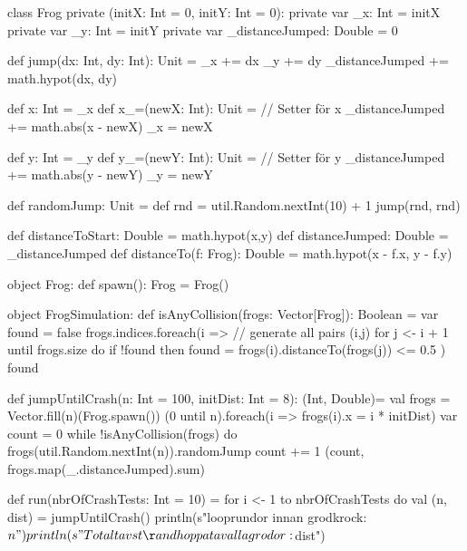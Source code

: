 \SubtaskSolved
\begin{Code}
class Frog private (initX: Int = 0, initY: Int = 0):
    private var _x: Int = initX
    private var _y: Int = initY
    private var _distanceJumped: Double = 0

    def jump(dx: Int, dy: Int): Unit =
        _x += dx
        _y += dy
        _distanceJumped += math.hypot(dx, dy)

    def x: Int = _x
    def x_=(newX: Int): Unit = // Setter för x
        _distanceJumped += math.abs(x - newX)
        _x = newX

    def y: Int = _y
    def y_=(newY: Int): Unit = // Setter för y
        _distanceJumped += math.abs(y - newY)
        _y = newY


    def randomJump: Unit =
        def rnd = util.Random.nextInt(10) + 1
        jump(rnd, rnd)

    def distanceToStart: Double = math.hypot(x,y)
    def distanceJumped: Double = _distanceJumped
    def distanceTo(f: Frog): Double = math.hypot(x - f.x, y - f.y)

object Frog:
    def spawn(): Frog = Frog()
\end{Code}

\SubtaskSolved
\begin{Code}
object FrogSimulation:
    def isAnyCollision(frogs: Vector[Frog]): Boolean =
        var found = false
        frogs.indices.foreach(i =>  // generate all pairs (i,j)
            for j <- i + 1 until frogs.size do
                if !found then
                    found = frogs(i).distanceTo(frogs(j)) <= 0.5
        )
        found

    def jumpUntilCrash(n: Int = 100, initDist: Int = 8): (Int, Double)=
        val frogs = Vector.fill(n)(Frog.spawn())
        (0 until n).foreach(i => frogs(i).x = i * initDist)
        var count = 0
        while !isAnyCollision(frogs) do
            frogs(util.Random.nextInt(n)).randomJump
            count += 1
        (count, frogs.map(_.distanceJumped).sum)


    def run(nbrOfCrashTests: Int = 10) =
        for i <- 1 to nbrOfCrashTests do
            val (n, dist) = jumpUntilCrash()
            println(s"\nAntalet looprundor innan grodkrock: $n")
            println(s"Totalt avstånd hoppat av alla grodor: $dist")
\end{Code}

\QUESTEND




\QUESTBEGIN

